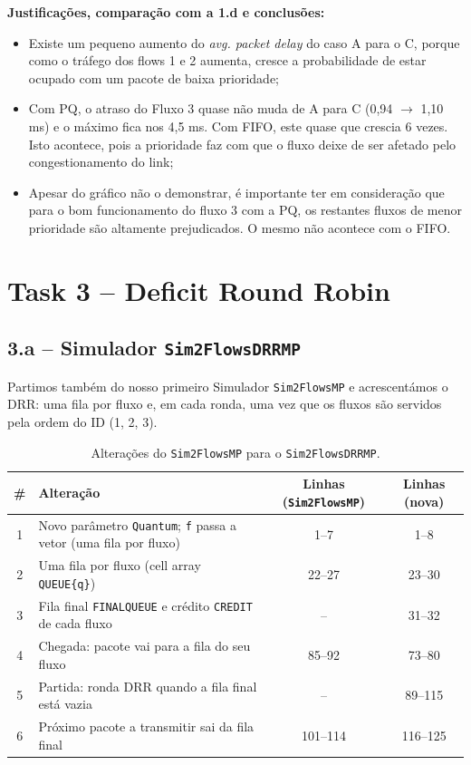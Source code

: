 \documentclass[11pt,a4paper]{article}
\newcommand{\code}[1]{\texttt{#1}}
\begin{document}
\textbf{Justificações, comparação com a 1.d e conclusões:}
\begin{itemize}
    \item Existe um pequeno aumento do \textit{avg. packet delay} do caso A para o C, porque como o tráfego dos flows 1 e 2 aumenta, cresce a probabilidade de estar ocupado com um pacote de baixa prioridade;
    \item Com PQ, o atraso do Fluxo 3 quase não muda de A para C (0,94 $\rightarrow$ 1,10 ms) e o máximo fica nos 4,5 ms. 
  Com FIFO, este quase que crescia 6 vezes. Isto acontece, pois a prioridade faz com que o fluxo deixe de ser afetado pelo congestionamento do link;
    \item Apesar do gráfico não o demonstrar, é importante ter em consideração que para o bom funcionamento do fluxo 3 com a PQ, os restantes fluxos de menor prioridade são altamente prejudicados. O mesmo não acontece com o FIFO.
\end{itemize}

\newpage
\section{Task 3 -- Deficit Round Robin}

\subsection{3.a -- Simulador \code{Sim2FlowsDRRMP}}

Partimos também do nosso primeiro Simulador \code{Sim2FlowsMP} e acrescentámos o DRR: uma fila por fluxo e, em cada ronda, uma vez que os fluxos são servidos pela ordem do ID (1, 2, 3).

\begin{table}[H]
\centering
\caption{Alterações do \code{Sim2FlowsMP} para o \code{Sim2FlowsDRRMP}.}
\begin{tabularx}{\textwidth}{c X c c}
\toprule
\# & Alteração & Linhas (\code{Sim2FlowsMP}) & Linhas (nova) \\
\midrule
1 & Novo parâmetro \code{Quantum}; \code{f} passa a vetor (uma fila por fluxo) & 1--7 & 1--8 \\
2 & Uma fila por fluxo (cell array \code{QUEUE\{q\}}) & 22--27 & 23--30 \\
3 & Fila final \code{FINALQUEUE} e crédito \code{CREDIT} de cada fluxo & -- & 31--32 \\
4 & Chegada: pacote vai para a fila do seu fluxo & 85--92 & 73--80 \\
5 & Partida: ronda DRR quando a fila final está vazia & -- & 89--115 \\
6 & Próximo pacote a transmitir sai da fila final & 101--114 & 116--125 \\
\bottomrule
\end{tabularx}
\end{table}
\end{document}
